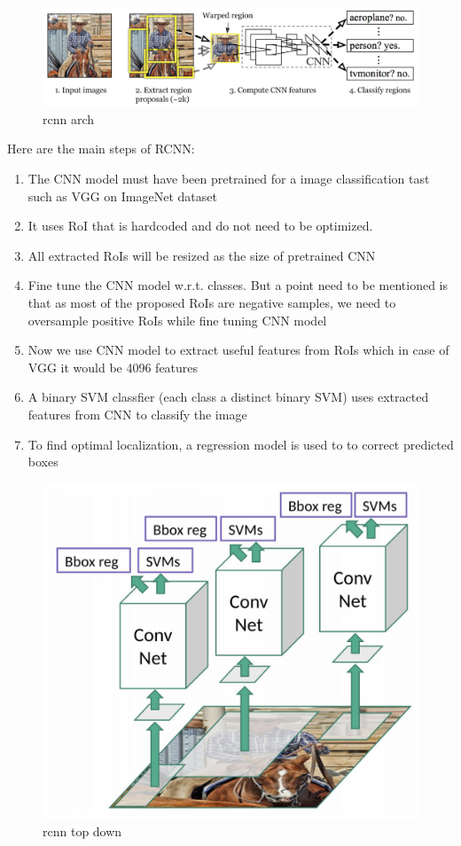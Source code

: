 \documentclass[11pt]{article}
\makeatletter
\def\maxwidth{\ifdim\Gin@nat@width>\linewidth\linewidth
    \else\Gin@nat@width\fi}
\let\Oldincludegraphics\includegraphics
\renewcommand{\includegraphics}[1]{\Oldincludegraphics[width=.8\maxwidth]{#1}}
\providecommand{\tightlist}{%
      \setlength{\itemsep}{0pt}\setlength{\parskip}{0pt}}
\makeatother
\begin{document}
\begin{figure}
\centering
\includegraphics{wiki/rcnn1.png}
\caption{rcnn arch}
\end{figure}

Here are the main steps of RCNN:

\begin{enumerate}
\def\labelenumi{\arabic{enumi}.}
\tightlist
\item
  The CNN model must have been pretrained for a image classification
  tast such as VGG on ImageNet dataset
\item
  It uses RoI that is hardcoded and do not need to be optimized.
\item
  All extracted RoIs will be resized as the size of pretrained CNN
\item
  Fine tune the CNN model w.r.t. classes. But a point need to be
  mentioned is that as most of the proposed RoIs are negative samples,
  we need to oversample positive RoIs while fine tuning CNN model
\item
  Now we use CNN model to extract useful features from RoIs which in
  case of VGG it would be 4096 features
\item
  A binary SVM classfier (each class a distinct binary SVM) uses
  extracted features from CNN to classify the image
\item
  To find optimal localization, a regression model is used to to correct
  predicted boxes
\end{enumerate}

\begin{figure}
\centering
\includegraphics{wiki/rcnn2.png}
\caption{rcnn top down}
\end{figure}
\end{document}
